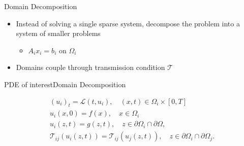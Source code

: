 \documentclass[]{beamer}
\begin{document}
\begin{frame}{Domain Decomposition}

  \begin{itemize}
  \item<1-> Instead of solving a single sparse system, decompose the
    problem into a system of smaller problems
    \begin{itemize}
    \item $A_i x_i = b_i$ on $\Omega_i$
    \end{itemize}
  \item<1-> Domains couple through transmission condition $\mathcal{T}$
  \end{itemize}

  \begin{figure}
    \centering
  \end{figure}


\end{frame}


\begin{frame}{PDE of interest}{Domain Decomposition}
  
  \begin{eqnarray}
    (u_i)_t =  \mathcal{L}(t,u_i), \quad (x,t)\in \Omega_i\times[0,T]\\
    \nonumber
    u_i(x,0) = f(x), \quad x \in \Omega_i \\
    \nonumber
    u_i(z,t) = g(z,t), \quad z \in \partial\Omega_i\cap\partial\Omega, \\
    \nonumber
    \mathcal{T}_{ij}(u_{i}(z,t)) = \mathcal{T}_{ij}(u_{j}(z,t)), \quad z \in \partial\Omega_i\cap\partial\Omega_j.
  \end{eqnarray}  
\end{frame}
\end{document}
